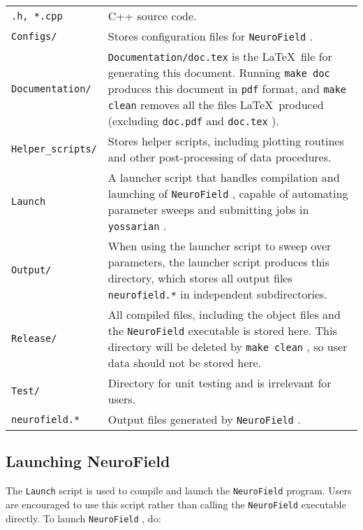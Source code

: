 \documentclass[12pt,a4paper]{article}
\newcommand{\type}[1]{ {\small\small\tt #1} }
\begin{document}
\begin{tabular}{l p{12cm}}
\type{*.h, *.cpp}& C++ source code.\\
\type{Configs/}& Stores configuration files for \type{NeuroField}.\\
\type{Documentation/}& \type{Documentation/doc.tex} is the \LaTeX\ file for generating this document. Running \type{make doc} produces this document in \type{pdf} format, and \type{make clean} removes all the files \LaTeX\ produced (excluding \type{doc.pdf} and \type{doc.tex}).\\
\type{Helper\_scripts/}& Stores helper scripts, including plotting routines and other post-processing of data procedures.\\
\type{Launch}& A launcher script that handles compilation and launching of \type{NeuroField}, capable of automating parameter sweeps and submitting jobs in \type{yossarian}.\\
\type{Output/}& When using the launcher script to sweep over parameters, the launcher script produces this directory, which stores all output files \type{neurofield.*} in independent subdirectories.\\
\type{Release/}& All compiled files, including the object files and the \type{NeuroField} executable is stored here. This directory will be deleted by \type{make clean}, so user data should not be stored here.\\
\type{Test/}& Directory for unit testing and is irrelevant for users.\\
\type{neurofield.*}& Output files generated by \type{NeuroField}.
\end{tabular}

\subsection{Launching NeuroField}
\label{sec:launch}

The \type{Launch} script is used to compile and launch the \type{NeuroField} program. Users are encouraged to use this script rather than calling the \type{NeuroField} executable directly. To launch \type{NeuroField}, do:
\end{document}

